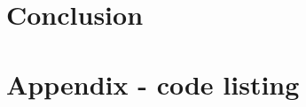 \documentclass[12pt,a4paper]{article}
\begin{document}
\section{Conclusion}


\appendix
\section{Appendix - code listing}

\begin{verbatim}
\end{verbatim}

\nocite{*}


\end{document}
